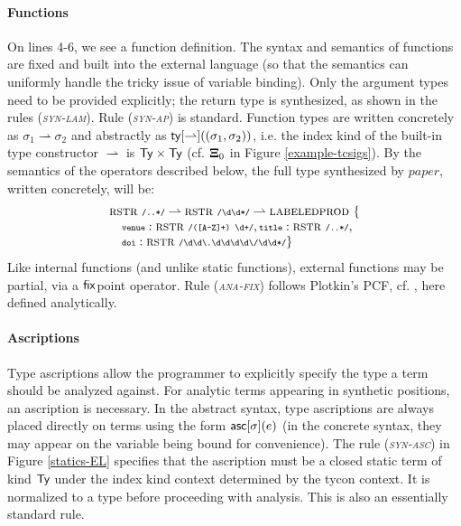 \documentclass[9pt,preprint]{sigplanconf}
\newcommand{\rulename}[1]{({\textsc{\textsl{#1}}})}
\begin{document}
\paragraph{Functions} 


On lines 4-6, we see a function definition. The syntax and semantics of functions are fixed and built into the external language (so that the semantics can uniformly handle the tricky issue of variable binding). Only the argument types need to be provided explicitly; the return type is synthesized, as shown in the rules \rulename{syn-lam}. Rule \rulename{syn-ap} is standard. Function types are written concretely as $\sigma_1 \rightharpoonup \sigma_2$ and abstractly as ${\sf ty}[\rightharpoonup]((\sigma_1, \sigma_2))$, i.e. the index kind of the built-in type constructor $\rightharpoonup$ is ${\sf Ty}\times{\sf Ty}$ (cf. $\boldsymbol\Xi_0$ in Figure \ref{example-tcsigs}). By the semantics of the operators described below, the full type synthesized by $paper$, written concretely, will be:
\[\begin{array}{l}
\concty{rstr}{\concrx{..*}} \rightharpoonup \concty{rstr}{\concrx{\digit\digit*}} \rightharpoonup \concty{labeledprod}{\{\\
\quad \conclbl{venue} : \concty{rstr}{\concrx{([A-Z]+) \digit+}}, \conclbl{title} : \concty{rstr}{\concrx{..*}},\\
\quad \conclbl{doi} : \concty{rstr}{\concrx{\digit\digit\rdot\digit\digit\digit\digit\textbackslash/\digit\digit*}}\}}
\end{array}\]
 Like internal functions (and unlike static functions), external functions may be partial, via a ${\sf fix}$point operator. Rule \rulename{ana-fix} follows Plotkin's PCF, cf. \cite{pfpl}, here defined analytically. %

\paragraph{Ascriptions} Type ascriptions allow the programmer to explicitly specify the type a term should be analyzed against. For analytic terms appearing in synthetic positions, an ascription is necessary. In the abstract syntax, type ascriptions are always placed directly on terms using the form ${\sf asc}[\sigma](e)$ (in the concrete syntax, they may appear on the variable being bound for convenience). The rule \rulename{syn-asc} in Figure \ref{statics-EL} specifies that the ascription must be a closed static term of kind ${\sf Ty}$ under the index kind context determined by the tycon context. It is normalized to a type before proceeding with analysis. This is also an essentially standard rule.
\end{document}
